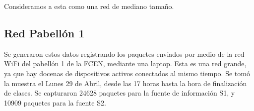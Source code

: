 Consideramos a esta como una red de mediano tamaño.

\subsection{Red Pabellón 1}
Se generaron estos datos registrando los paquetes enviados por medio de 
la red WiFi del pabellón 1 de la FCEN, mediante una laptop. Esta es una 
red grande, ya que hay docenas de dispositivos activos conectados al mismo
tiempo. Se tomó la muestra el Lunes 29 de Abril, desde las 17 horas hasta la hora de finalización de clases.
Se capturaron 24628 paquetes para la fuente de información S1, y 10909
paquetes para la fuente S2.
